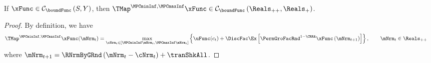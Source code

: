 \documentclass[\econtexRoot/BufferStockTheory]{subfiles}
\begin{document}
\begin{claim}\label{clm:hiraguchi_cont}
If $\xFunc\in  \mathcal{C}_{\boundFunc }\left( S,Y\right)$, then $\TMap^{\MPCminInf, \MPCmaxInf}{\mathfrak{\xFunc}}\in \mathcal{C}_{\boundFunc }\left(\Reals_{++}, \Reals_{+}\right)$. 
\end{claim}
%
\begin{proof}
By definition, we have
%
\begin{equation}\begin{gathered}\begin{aligned}
  \TMap^{\MPCminInf, \MPCmaxInf}{\mathfrak{\xFunc}}(\mNrm_{t}) & = \underset{\cNrm_{t} \in
                                            [\MPCminInf \mNrm_{t}, \MPCmaxInf \mNrm_{t}]
                                            }\max \left\{
                                            \uFunc(c_{t})+\DiscFac \Ex\left[ {\PermGroFacRnd}^{1-\CRRA }{\mathfrak{\xFunc}}
                                            \left( {\mNrm}_{t+1}\right) \right] \right\}, \qquad \mNrm_{t}\in \Reals_{++}  
\end{aligned}\end{gathered}\end{equation}
%
where ${\mNrm}_{t+1} = \RNrmByGRnd\left(\mNrm_{t} - \cNrm_{t}\right) + \tranShkAll$.


\end{proof}
\end{document}
